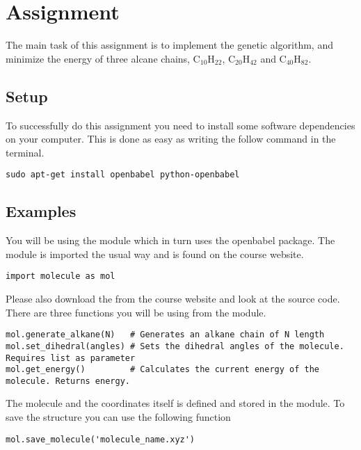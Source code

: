 \documentclass{article}
\begin{document}
\newpage
\section{Assignment}

The main task of this assignment is to implement the genetic algorithm, and minimize the energy of three alcane chains,
C$_{10}$H$_{22}$,
C$_{20}$H$_{42}$ and
C$_{40}$H$_{82}$.

\subsection{Setup}

To successfully do this assignment you need to install some software dependencies on your computer.
This is done as easy as writing the follow command in the terminal.

\begin{lstlisting}
sudo apt-get install openbabel python-openbabel
\end{lstlisting}

\subsection{Examples}

You will be using the module  which in turn uses the openbabel package.
The module is imported the usual way and is found on the course website.

\begin{lstlisting}
import molecule as mol
\end{lstlisting}

Please also download the  from the course website and look at the source code.\\

There are three functions you will be using from the module.

\begin{lstlisting}
mol.generate_alkane(N)   # Generates an alkane chain of N length
mol.set_dihedral(angles) # Sets the dihedral angles of the molecule. Requires list as parameter
mol.get_energy()         # Calculates the current energy of the molecule. Returns energy.
\end{lstlisting}

The molecule and the coordinates itself is defined and stored in the  module.
To save the structure you can use the following function

\begin{lstlisting}
mol.save_molecule('molecule_name.xyz')
\end{lstlisting}
\end{document}
